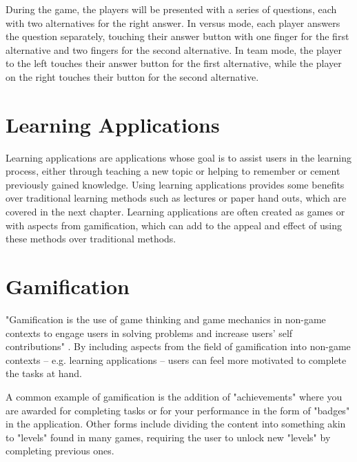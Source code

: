 During the game, the players will be presented with a series of questions, each with two alternatives for the right answer. In versus mode, each player answers the question separately, touching their answer button with one finger for the first alternative and two fingers for the second alternative. In team mode, the player to the left touches their answer button for the first alternative, while the player on the right touches their button for the second alternative.


\section{Learning Applications}

Learning applications are applications whose goal is to assist users in the learning process, either through teaching a new topic or helping to remember or cement previously gained knowledge. Using learning applications provides some benefits over traditional learning methods such as lectures or paper hand outs, which are covered in the next chapter. Learning applications are often created as games or with aspects from gamification, which can add to the appeal and effect of using these methods over traditional methods.


\section{Gamification}

"Gamification is the use of game thinking and game mechanics in non-game contexts to engage users in solving problems and increase users' self contributions" \citep{WikipediaOnGamification}. By including aspects from the field of gamification into non-game contexts – e.g. learning applications – users can feel more motivated to complete the tasks at hand.

A common example of gamification is the addition of "achievements" where you are awarded for completing tasks or for your performance in the form of "badges" in the application. Other forms include dividing the content into something akin to "levels" found in many games, requiring the user to unlock new "levels" by completing previous ones.